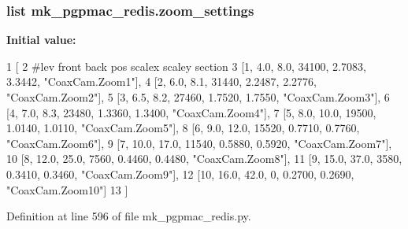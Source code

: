 \hypertarget{namespacemk__pgpmac__redis_ad91bac9be746f99e1cf1f8e28ff348be}{
\subsubsection[{zoom\-\_\-settings}]{\setlength{\rightskip}{0pt plus 5cm}list mk\-\_\-pgpmac\-\_\-redis.\-zoom\-\_\-settings}}\label{namespacemk__pgpmac__redis_ad91bac9be746f99e1cf1f8e28ff348be}
{\bfseries Initial value\-:}
\begin{DoxyCode}
1 [
2     \textcolor{comment}{#lev   front  back  pos     scalex  scaley   section}
3     [1,     4.0,   8.0,  34100, 2.7083,  3.3442, \textcolor{stringliteral}{"CoaxCam.Zoom1"}],
4     [2,     6.0,   8.1,  31440, 2.2487,  2.2776, \textcolor{stringliteral}{"CoaxCam.Zoom2"}],
5     [3,     6.5,   8.2,  27460, 1.7520,  1.7550, \textcolor{stringliteral}{"CoaxCam.Zoom3"}],
6     [4,     7.0,   8.3,  23480, 1.3360,  1.3400, \textcolor{stringliteral}{"CoaxCam.Zoom4"}],
7     [5,     8.0,  10.0,  19500, 1.0140,  1.0110, \textcolor{stringliteral}{"CoaxCam.Zoom5"}],
8     [6,     9.0,  12.0,  15520, 0.7710,  0.7760, \textcolor{stringliteral}{"CoaxCam.Zoom6"}],
9     [7,    10.0,  17.0,  11540, 0.5880,  0.5920, \textcolor{stringliteral}{"CoaxCam.Zoom7"}],
10     [8,    12.0,  25.0,   7560, 0.4460,  0.4480, \textcolor{stringliteral}{"CoaxCam.Zoom8"}],
11     [9,    15.0,  37.0,   3580, 0.3410,  0.3460, \textcolor{stringliteral}{"CoaxCam.Zoom9"}],
12     [10,   16.0,  42.0,      0, 0.2700,  0.2690, \textcolor{stringliteral}{"CoaxCam.Zoom10"}]
13     ]
\end{DoxyCode}


Definition at line 596 of file mk\-\_\-pgpmac\-\_\-redis.\-py.

